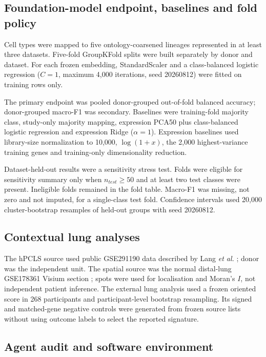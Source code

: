 \documentclass[11pt]{article}
\begin{document}
\subsection*{Foundation-model endpoint, baselines and fold policy}

Cell types were mapped to five ontology-coarsened lineages represented in at least three datasets. Five-fold GroupKFold splits were built separately by donor and dataset. For each frozen embedding, StandardScaler and a class-balanced logistic regression ($C=1$, maximum 4,000 iterations, seed 20260812) were fitted on training rows only.

The primary endpoint was pooled donor-grouped out-of-fold balanced accuracy; donor-grouped macro-F1 was secondary. Baselines were training-fold majority class, study-only majority mapping, expression PCA50 plus class-balanced logistic regression and expression Ridge ($\alpha=1$). Expression baselines used library-size normalization to 10,000, $\log(1+x)$, the 2,000 highest-variance training genes and training-only dimensionality reduction.

Dataset-held-out results were a sensitivity stress test. Folds were eligible for sensitivity summary only when $n_{test}\geq50$ and at least two test classes were present. Ineligible folds remained in the fold table. Macro-F1 was missing, not zero and not imputed, for a single-class test fold. Confidence intervals used 20,000 cluster-bootstrap resamples of held-out groups with seed 20260812.

\subsection*{Contextual lung analyses}

The hPCLS source used public GSE291190 data described by Lang \emph{et al.} \cite{Lang2023}; donor was the independent unit. The spatial source was the normal distal-lung GSE178361 Visium section \cite{Murthy2022}; spots were used for localisation and Moran's $I$, not independent patient inference. The external lung analysis used a frozen oriented score in 268 participants and participant-level bootstrap resampling. Its signed and matched-gene negative controls were generated from frozen source lists without using outcome labels to select the reported signature.

\subsection*{Agent audit and software environment}
\end{document}
